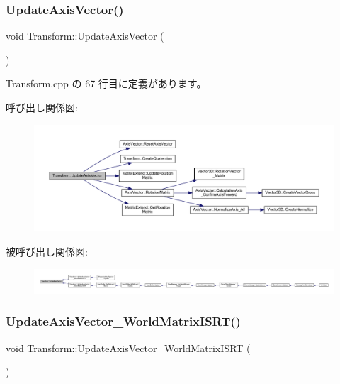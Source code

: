 \subsubsection{\texorpdfstring{Update\+Axis\+Vector()}{UpdateAxisVector()}}
{\footnotesize\ttfamily void Transform\+::\+Update\+Axis\+Vector (\begin{DoxyParamCaption}{ }\end{DoxyParamCaption})}



 Transform.\+cpp の 67 行目に定義があります。

呼び出し関係図\+:\nopagebreak
\begin{figure}[H]
\begin{center}
\leavevmode
\includegraphics[width=350pt]{class_transform_afe5350bb1558256115e14c0669611acd_cgraph}
\end{center}
\end{figure}
被呼び出し関係図\+:
\nopagebreak
\begin{figure}[H]
\begin{center}
\leavevmode
\includegraphics[width=350pt]{class_transform_afe5350bb1558256115e14c0669611acd_icgraph}
\end{center}
\end{figure}
\mbox{\label{class_transform_a73a20f2b8baad21ba74a2b1c6d8a1ab2}} 
\subsubsection{\texorpdfstring{Update\+Axis\+Vector\+\_\+\+World\+Matrix\+I\+S\+R\+T()}{UpdateAxisVector\_WorldMatrixISRT()}}
{\footnotesize\ttfamily void Transform\+::\+Update\+Axis\+Vector\+\_\+\+World\+Matrix\+I\+S\+RT (\begin{DoxyParamCaption}{ }\end{DoxyParamCaption})}



